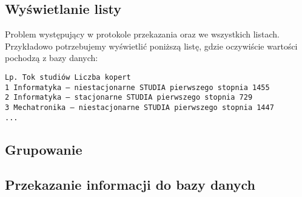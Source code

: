  \subsection{Wyświetlanie listy}
Problem występujący w protokole przekazania oraz we wszystkich listach. Przykładowo potrzebujemy wyświetlić poniższą listę, gdzie oczywiście wartości pochodzą z bazy danych:
\begin{lstlisting}
Lp. Tok studiów Liczba kopert
1 Informatyka — niestacjonarne STUDIA pierwszego stopnia 1455
2 Informatyka — stacjonarne STUDIA pierwszego stopnia 729
3 Mechatronika — niestacjonarne STUDIA pierwszego stopnia 1447
...
\end{lstlisting}

\subsection{Grupowanie}
\subsection{Przekazanie informacji do bazy danych}